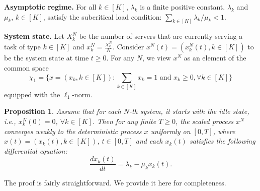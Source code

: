 \documentclass[11pt, reqno]{article}
\newtheorem{prop}[theorem]{Proposition}
\numberwithin{equation}{section}
\numberwithin{theorem}{section}
\begin{document}
\noindent
\textbf{Asymptotic regime.} For all $k\in[K]$, $\lambda_k$ is a finite positive constant. $\lambda_k$ and $\mu_k$, $k\in[K]$, satisfy the subcritical load condition: $\sum_{k\in[K]}\lambda_k/\mu_k<1$.
\vspace{3mm}

\noindent
\textbf{System state.} Let $X^N_{k}$ be the number of servers that are currently serving a task of type $k\in[K]$ and $x^N_{k}=\frac{X^N_k}{N}$. Consider $x^N(t)=(x^N_k(t),k\in[K])$ to be the system state at time $t\geq 0$. For any $N$, we view $x^N$ as an element of the common space
$$\chi_1=\Big\{x=(x_k,k\in[K]):\sum_{k\in[K]}x_k=1\text{ and } x_k\geq 0,\forall k\in[K]\Big\}$$
equipped with the $\ell_1$-norm.

\begin{prop}\label{prop:fluid-multiclass}
Assume that for each $N$-th system, it starts with the idle state, i.e., $x^N_k(0)=0$, $\forall k\in[K]$. Then for any finite $T\geq 0$,  the scaled process $x^N$ converges weakly to the deterministic process $x$ uniformly on $[0,T]$,
where $x(t)=(x_{k}(t),k\in[K])$, $t\in[0,T]$ and each $x_{k}(t)$ satisfies the following differential equation: 
\begin{equation}\label{eq:ode-multitask}
    \frac{d x_{k}(t)}{dt}=\lambda_{k}-\mu_k x_{k}(t).
\end{equation}
\end{prop}
The proof is fairly straightforward. We provide it here for completeness.
\end{document}
